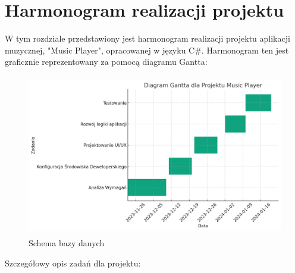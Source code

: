 ﻿%
\chapter{Harmonogram realizacji projektu}

{W tym rozdziale przedstawiony jest harmonogram realizacji projektu aplikacji muzycznej, "Music Player", opracowanej w języku C\#. Harmonogram ten jest graficznie reprezentowany za pomocą diagramu Gantta: }

\begin{figure}[!ht]
	\begin{center}
	\includegraphics[height=200pt]{figures/diagram_gantta.png}
        \caption{{\footnotesize Schema bazy danych}}
	\end{center}
\end{figure}

{Szczegółowy opis zadań dla projektu:}

